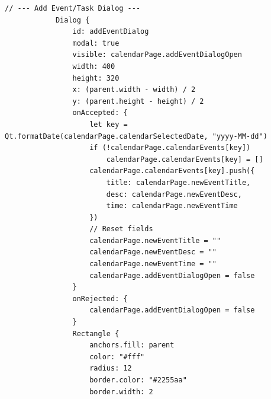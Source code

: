\documentclass{report}
\begin{document}
\begin{lstlisting}[style=qmlstyle]
            // --- Add Event/Task Dialog ---
            Dialog {
                id: addEventDialog
                modal: true
                visible: calendarPage.addEventDialogOpen
                width: 400
                height: 320
                x: (parent.width - width) / 2
                y: (parent.height - height) / 2
                onAccepted: {
                    let key = Qt.formatDate(calendarPage.calendarSelectedDate, "yyyy-MM-dd")
                    if (!calendarPage.calendarEvents[key])
                        calendarPage.calendarEvents[key] = []
                    calendarPage.calendarEvents[key].push({
                        title: calendarPage.newEventTitle,
                        desc: calendarPage.newEventDesc,
                        time: calendarPage.newEventTime
                    })
                    // Reset fields
                    calendarPage.newEventTitle = ""
                    calendarPage.newEventDesc = ""
                    calendarPage.newEventTime = ""
                    calendarPage.addEventDialogOpen = false
                }
                onRejected: {
                    calendarPage.addEventDialogOpen = false
                }
                Rectangle {
                    anchors.fill: parent
                    color: "#fff"
                    radius: 12
                    border.color: "#2255aa"
                    border.width: 2


\end{lstlisting}
\end{document}

